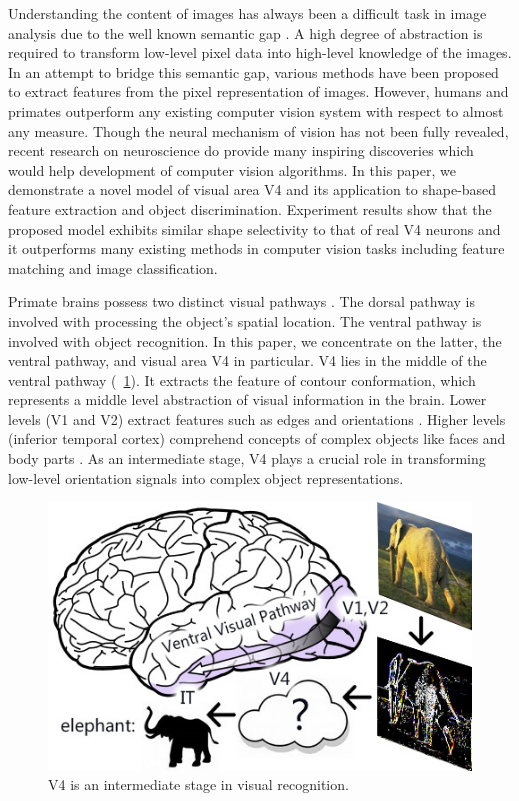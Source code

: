 \documentclass[10pt]{article}
\begin{document}
Understanding the content of images has always been a difficult task in image analysis due to the well known semantic gap \cite{smeulders2000}.
A high degree of abstraction is required to transform low-level pixel data into high-level knowledge of the images.
In an attempt to bridge this semantic gap, various methods have been proposed to extract features from the pixel representation of images.
However, humans and primates outperform any existing computer vision system with respect to almost any measure.
Though the neural mechanism of vision has not been fully revealed,
recent research on neuroscience do provide many inspiring discoveries which would help development of computer vision algorithms.
In this paper, we demonstrate a novel model of visual area V4 and its application to shape-based feature extraction and object discrimination.
Experiment results show that the proposed model exhibits similar shape selectivity to that of real V4 neurons
and it outperforms many existing methods in computer vision tasks including feature matching and image classification. 

Primate brains possess two distinct visual pathways \cite{ettlinger1990}.
The dorsal pathway is involved with processing the object's spatial location. 
The ventral pathway is involved with object recognition.
In this paper, we concentrate on the latter, the ventral pathway, and visual area V4 in particular.
V4 lies in the middle of the ventral pathway (\figurename~\ref{fig:1}).
It extracts the feature of contour conformation, which represents a middle level abstraction of visual information in the brain.
Lower levels (V1 and V2) extract features such as edges and orientations \cite{hubel1962}.
Higher levels (inferior temporal cortex) comprehend concepts of complex objects like faces and body parts \cite{bell2009}.
As an intermediate stage, V4 plays a crucial role in transforming low-level orientation signals into complex object representations.

\begin{figure}
\centerline{\includegraphics[width=0.8\linewidth]{images/fig1.jpg}} 
\caption{V4 is an intermediate stage in visual recognition.}
\label{fig:1}
\end{figure}
\end{document}
